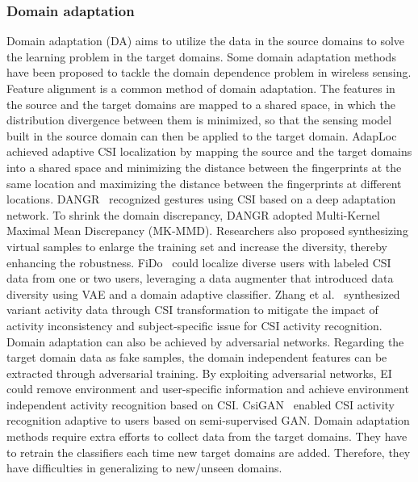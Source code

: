 \documentclass[journal]{IEEEtran}
\begin{document}
\subsubsection{Domain adaptation}
Domain adaptation (DA) aims to utilize the data in the source domains to solve the learning problem in the target domains. Some domain adaptation methods have been proposed to tackle the domain dependence problem in wireless sensing.
%
Feature alignment is a common method of domain adaptation. The features in the source and the target domains are mapped to a shared space, in which the distribution divergence between them is minimized, so that the sensing model built in the source domain can then be applied to the target domain. AdapLoc~\cite{ZhouR:2021} achieved adaptive CSI localization by mapping the source and the target domains into a shared space and minimizing the distance between the fingerprints at the same location and maximizing the distance between the fingerprints at different locations. DANGR~\cite{HanZ:2020} recognized gestures using CSI based on a deep adaptation network. To shrink the domain discrepancy, DANGR adopted Multi-Kernel Maximal Mean Discrepancy (MK-MMD).
%
Researchers also proposed synthesizing virtual samples to enlarge the training set and increase the diversity, thereby enhancing the robustness. FiDo~\cite{ChenX:2020} could localize diverse users with labeled CSI data from one or two users, leveraging a data augmenter that introduced data diversity using VAE and a domain adaptive classifier. Zhang et al.~\cite{ZhangJ:2021} synthesized variant activity data through CSI transformation to mitigate the impact of activity inconsistency and subject-specific issue for CSI activity recognition. 
%
Domain adaptation can also be achieved by adversarial networks. Regarding the target domain data as fake samples, the domain independent features can be extracted through adversarial training. By exploiting adversarial networks, EI~\cite{JiangWJ:2018} could remove environment and user-specific information and achieve environment independent activity recognition based on CSI. CsiGAN~\cite{XiaoCJ:2019} enabled CSI activity recognition adaptive to users based on semi-supervised GAN. 
%
Domain adaptation methods require extra efforts to collect data from the target domains. They have to retrain the classifiers each time new target domains are added. Therefore, they have difficulties in generalizing to new/unseen domains.  
\end{document}
